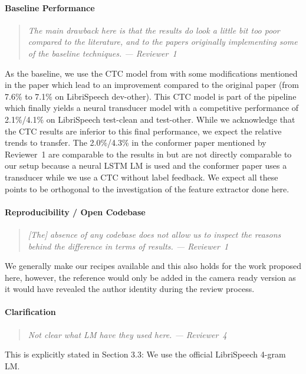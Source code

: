 \documentclass[11pt]{extarticle}
\begin{document}
\paragraph{Baseline Performance}
\begin{quote}\textit{
The main drawback here is that the results do look a little bit too poor compared to the literature, and to the papers originally implementing some of the baseline techniques.
--- Reviewer~1
}\end{quote}
As the baseline, we use the CTC model from \cite{zhou2022efficient} with some modifications mentioned in the paper which lead to an improvement compared to the original paper (from 7.6\% to 7.1\% on LibriSpeech dev-other).
This CTC model is part of the pipeline which finally yields a neural transducer model with a competitive performance of 2.1\%/4.1\% on LibriSpeech test-clean and test-other.
While we acknowledge that the CTC results are inferior to this final performance, we expect the relative trends to transfer.
The 2.0\%/4.3\% in the conformer paper mentioned by Reviewer~1 are comparable to the results in \cite{zhou2022efficient} but are not directly comparable to our setup because a neural LSTM LM is used and the conformer paper uses a transducer while we use a CTC without label feedback.
We expect all these points to be orthogonal to the investigation of the feature extractor done here.

\paragraph{Reproducibility / Open Codebase}
\begin{quote}\textit{
[The] absence of any codebase does not allow us to inspect the reasons behind the difference in terms of results.
--- Reviewer~1
}\end{quote}
We generally make our recipes available and this also holds for the work proposed here, however, the reference would only be added in the camera ready version as it would have revealed the author identity during the review process.

\paragraph{Clarification}
\begin{quote}\textit{
Not clear what LM have they used here.
--- Reviewer~4
}\end{quote}
This is explicitly stated in Section 3.3: We use the official LibriSpeech 4-gram LM.



\end{document}

